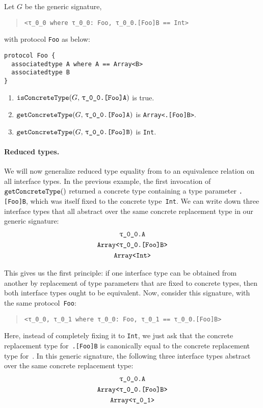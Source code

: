 \documentclass[../generics]{subfiles}
\begin{document}
\begin{example}\label{concrete type query example}
Let $G$ be the generic signature,
\begin{quote}
\begin{verbatim}
<τ_0_0 where τ_0_0: Foo, τ_0_0.[Foo]B == Int>
\end{verbatim}
\end{quote}
with protocol \texttt{Foo} as below:
\begin{Verbatim}
protocol Foo {
  associatedtype A where A == Array<B>
  associatedtype B
}
\end{Verbatim}
\begin{enumerate}
\item $\Query{isConcreteType}{G,\,\texttt{\rT.[Foo]A}}$ is true.
\item $\Query{getConcreteType}{G,\,\texttt{\rT.[Foo]A}}$ is \texttt{Array<\rT.[Foo]B>}.
\item $\Query{getConcreteType}{G,\,\texttt{\rT.[Foo]B}}$ is \texttt{Int}.
\end{enumerate}
\end{example}

\paragraph{Reduced types.} We will now generalize reduced type equality from  to an equivalence relation on all interface types. In the previous example, the first invocation of $\texttt{getConcreteType}()$ returned a concrete type containing a type parameter \texttt{\rT.[Foo]B}, which was itself fixed to the concrete type~\texttt{Int}. We can write down three interface types that all abstract over the same concrete replacement type in our generic signature:
\begin{gather*}
\texttt{\rT.A}\\
\texttt{Array<\rT.[Foo]B>}\\
\texttt{Array<Int>}
\end{gather*}

This gives us the first principle: if one interface type can be obtained from another by replacement of type parameters that are fixed to concrete types, then both interface types ought to be equivalent. Now, consider this signature, with the same protocol~\texttt{Foo}:
\begin{quote}
\begin{verbatim}
<τ_0_0, τ_0_1 where τ_0_0: Foo, τ_0_1 == τ_0_0.[Foo]B>
\end{verbatim}
\end{quote}
Here, instead of completely fixing it to \texttt{Int}, we just ask that the concrete replacement type for~\texttt{\rT.[Foo]B} is canonically equal to the concrete replacement type for~\rU. In this generic signature, the following three interface types abstract over the same concrete replacement type:
\begin{gather*}
\texttt{\rT.A}\\
\texttt{Array<\rT.[Foo]B>}\\
\texttt{Array<\rU>}
\end{gather*}
\end{document}
